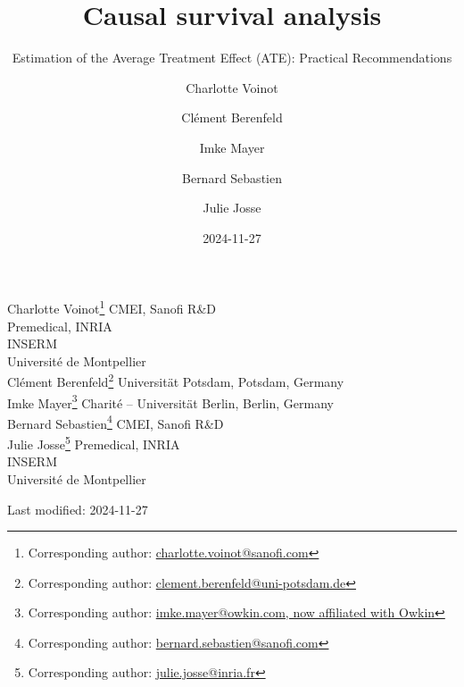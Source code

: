 \documentclass[
  11pt,
  a4paper,
]{article}
\title{Causal survival analysis}
\subtitle{Estimation of the Average Treatment Effect (ATE): Practical
Recommendations}
\author{Charlotte Voinot \and Clément Berenfeld \and Imke
Mayer \and Bernard Sebastien \and Julie Josse}
\date{2024-11-27}
\theoremstyle{plain}
\theoremstyle{plain}
\theoremstyle{plain}
\theoremstyle{definition}
\theoremstyle{remark}
\begin{document}



\vspace*{2.5cm}
\begin{center}
          Charlotte
Voinot\footnote{Corresponding author: \href{mailto:charlotte.voinot@sanofi.com}{charlotte.voinot@sanofi.com}}\quad
             CMEI, Sanofi R\&D\\
              Premedical, INRIA\\
              INSERM\\
              Université de Montpellier\\
                 Clément
Berenfeld\footnote{Corresponding author: \href{mailto:clement.berenfeld@uni-potsdam.de}{clement.berenfeld@uni-potsdam.de}}\quad
             Universität Potsdam, Potsdam, Germany\\
                 Imke
Mayer\footnote{Corresponding author: \href{mailto:imke.mayer@owkin.com,
now affiliated with Owkin}{imke.mayer@owkin.com, now affiliated with
Owkin}}\quad
             Charité -- Universität Berlin, Berlin, Germany\\
                 Bernard
Sebastien\footnote{Corresponding author: \href{mailto:bernard.sebastien@sanofi.com}{bernard.sebastien@sanofi.com}}\quad
             CMEI, Sanofi R\&D\\
                 Julie
Josse\footnote{Corresponding author: \href{mailto:julie.josse@inria.fr}{julie.josse@inria.fr}}\quad
             Premedical, INRIA\\
              INSERM\\
              Université de Montpellier\\
           
  \bigskip
  
	 Last modified: 2024-11-27
\end{center}
      
\end{document}
